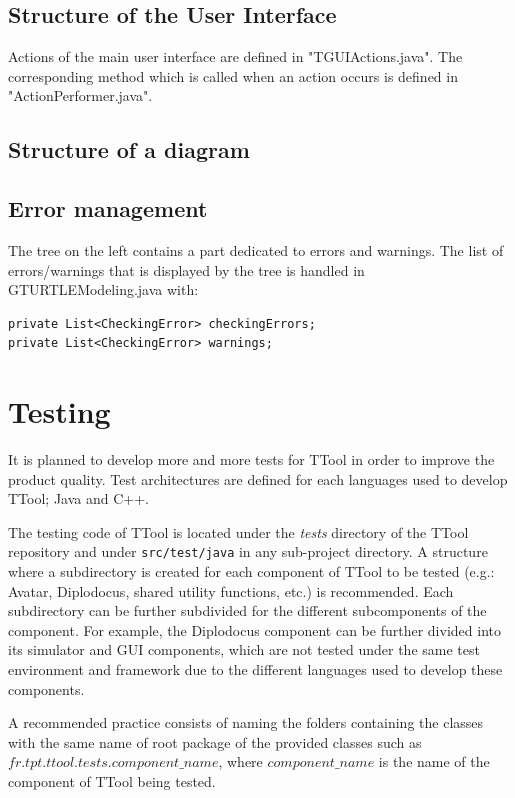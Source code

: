 \documentclass[12pt]{article}
\begin{document}
\subsection{Structure of the User Interface}
Actions of the main user interface are defined in "TGUIActions.java". The corresponding method which is called when an action occurs is defined in "ActionPerformer.java".

\subsection{Structure of a diagram}


\subsection{Error management}
The tree on the left contains a part dedicated to errors and warnings. The list of errors/warnings that is displayed by the tree is handled in GTURTLEModeling.java with:
\begin{lstlisting}
private List<CheckingError> checkingErrors;
private List<CheckingError> warnings;
\end{lstlisting}

\newpage

\section{Testing}

It is planned to develop more and more tests for TTool in order to improve the
product quality. Test architectures are defined for each languages used to
develop TTool; Java and C++.

The testing code of TTool is located under the \textit{tests} directory of the TTool
repository and under \texttt{src/test/java} in any sub-project directory. A structure where a subdirectory is created for each
component of TTool to be tested (e.g.: Avatar, Diplodocus, shared utility
functions, etc.) is recommended. Each subdirectory can be further subdivided for
the different subcomponents of the component. For example, the Diplodocus component can be
further divided into its simulator and GUI components, which are not tested
under the same test environment and framework due to the different languages
used to develop these components.

A recommended practice consists of naming the folders containing the classes
with the same name of root package of the provided classes such as
$fr.tpt.ttool.tests.component\_name$, where $component\_name$ is the name of the
component of TTool being tested.
\end{document}
